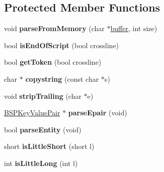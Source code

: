 \subsection*{Protected Member Functions}
\begin{DoxyCompactItemize}
\item 
\hypertarget{class_bsp_loader_afd480920330a91a18e609f7f048e8598}{void {\bfseries parse\+From\+Memory} (char $\ast$\hyperlink{structbuffer}{buffer}, int size)}\label{class_bsp_loader_afd480920330a91a18e609f7f048e8598}

\item 
\hypertarget{class_bsp_loader_a6504fffc72d529c9da9116dc0ae18f33}{bool {\bfseries is\+End\+Of\+Script} (bool crossline)}\label{class_bsp_loader_a6504fffc72d529c9da9116dc0ae18f33}

\item 
\hypertarget{class_bsp_loader_abdb41767463d733e96a150469f0ab85e}{bool {\bfseries get\+Token} (bool crossline)}\label{class_bsp_loader_abdb41767463d733e96a150469f0ab85e}

\item 
\hypertarget{class_bsp_loader_abe9e028406fa305521bbf24bd6818f07}{char $\ast$ {\bfseries copystring} (const char $\ast$s)}\label{class_bsp_loader_abe9e028406fa305521bbf24bd6818f07}

\item 
\hypertarget{class_bsp_loader_ad864341d62804fa547c78e9a033977c6}{void {\bfseries strip\+Trailing} (char $\ast$e)}\label{class_bsp_loader_ad864341d62804fa547c78e9a033977c6}

\item 
\hypertarget{class_bsp_loader_a91ae847f58b97cd2d1ab560734b9b7c8}{\hyperlink{struct_b_s_p_pair}{B\+S\+P\+Key\+Value\+Pair} $\ast$ {\bfseries parse\+Epair} (void)}\label{class_bsp_loader_a91ae847f58b97cd2d1ab560734b9b7c8}

\item 
\hypertarget{class_bsp_loader_a815a6f066c1f9552528edb640cde0e43}{bool {\bfseries parse\+Entity} (void)}\label{class_bsp_loader_a815a6f066c1f9552528edb640cde0e43}

\item 
\hypertarget{class_bsp_loader_afea8c4987509e170c30606f337793dab}{short {\bfseries is\+Little\+Short} (short l)}\label{class_bsp_loader_afea8c4987509e170c30606f337793dab}

\item 
\hypertarget{class_bsp_loader_a47dfe4cd8d017bebb1d25446f010be5a}{int {\bfseries is\+Little\+Long} (int l)}\label{class_bsp_loader_a47dfe4cd8d017bebb1d25446f010be5a}


\end{DoxyCompactItemize}
